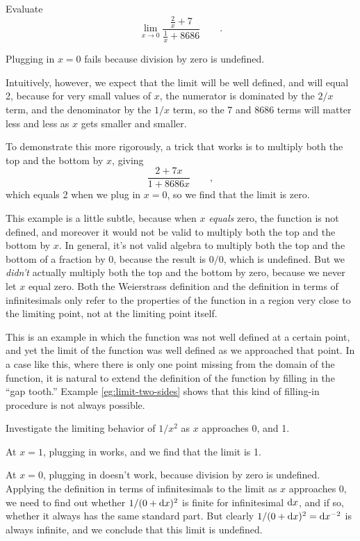 \begin{eg}
\egquestion Evaluate
\begin{equation*}
  \lim_{x\rightarrow 0} \frac{\frac{2}{x}+7}{\frac{1}{x}+8686} \qquad .
\end{equation*}

\eganswer Plugging in $x=0$ fails because division by zero is undefined.

Intuitively, however, we expect that the limit will be well defined, and will
equal 2, because for very small values of $x$, the numerator is dominated
by the $2/x$ term, and the denominator by the $1/x$ term, so the 7 and 8686 terms
will matter less and less as $x$ gets smaller and smaller.

To demonstrate this more rigorously, a trick that works is to multiply both the top and the bottom by $x$, giving
\begin{equation*}
  \frac{2+7x}{1+8686x} \qquad ,
\end{equation*}
which equals 2 when we plug in $x=0$, so we find that the limit is zero.

This example is a little subtle, because
when $x$ \emph{equals} zero, the function is not defined, and moreover it would
not be valid to multiply both the top and the bottom by $x$. In general, it's not
valid algebra to multiply both the top and the bottom of a fraction by 0, because the
result is $0/0$, which is undefined. But we \emph{didn't} actually multiply both the
top and the bottom by zero, because we never let $x$ equal zero. Both the Weierstrass
definition and the definition in terms of infinitesimals only refer to the properties of
the function in a region very close to the limiting point, not at the limiting point itself.

This is an example in which the function was not well defined at a certain point, and
yet the limit of the function was well defined as we approached that point. In a case like
this, where there is only one point missing from the domain of the function, it is natural
to extend the definition of the function by filling in the ``gap tooth.'' Example \ref{eg:limit-two-sides}
shows that this kind of filling-in procedure is not always possible.
\end{eg}


\begin{eg}\label{eg:no-limit}
\egquestion Investigate the limiting behavior of $1/x^2$ as $x$ approaches 0, and 1.

\eganswer At $x=1$, plugging in works, and we find that the limit is 1.

At $x=0$, plugging in doesn't work, because division by zero is undefined.
Applying the definition in terms of infinitesimals to the limit as $x$ approaches 0, we need to find
out whether $1/(0+\textup{d} x)^2$ is finite for infinitesimal $\textup{d} x$, and if so, whether it always has the same standard
part. But clearly $1/(0+\textup{d} x)^2=\textup{d} x^{-2}$ is always infinite, and we conclude that this limit is undefined.
\end{eg}

